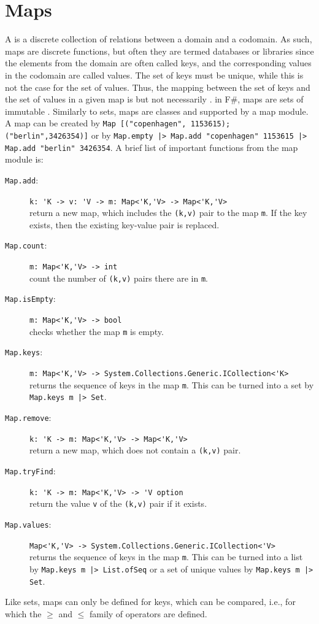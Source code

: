 \documentclass[fsharpNotes.tex]{subfiles}
\begin{document}
\section{Maps}
A  is a discrete collection of relations between a domain and a codomain. As such, maps are discrete functions, but often they are termed databases or libraries since the elements from the domain are often called keys, and the corresponding values in the codomain are called values. The set of keys must be unique, while this is not the case for the set of values. Thus, the mapping between the set of keys and the set of values in a given map is  but not necessarily . in F\#, maps are sets of immutable . Similarly to sets, maps are classes and supported by a map module. A map can be created by \lstinline{Map [("copenhagen", 1153615); ("berlin",3426354)]} or by \lstinline{Map.empty |> Map.add "copenhagen" 1153615 |> Map.add "berlin" 3426354}. A brief list of important functions from the map module is:
\begin{description}
\item[\texttt{Map.add}:] \lstinline{k: 'K -> v: 'V -> m: Map<'K,'V> -> Map<'K,'V>}~\\ return a new map, which includes the \lstinline{(k,v)} pair to the map \lstinline{m}. If the key exists, then the existing key-value pair is replaced.
\item[\texttt{Map.count}:] \lstinline{m: Map<'K,'V> -> int}~\\ count the number of \lstinline{(k,v)} pairs there are in \lstinline{m}.
\item[\texttt{Map.isEmpty}:] \lstinline{m: Map<'K,'V> -> bool}~\\ checks whether the map \lstinline{m} is empty.
\item[\texttt{Map.keys}:] \lstinline{m: Map<'K,'V> -> System.Collections.Generic.ICollection<'K>}~\\ returns the sequence of keys in the map \lstinline{m}. This can be turned into a set by \lstinline{Map.keys m |> Set}.
\item[\texttt{Map.remove}:] \lstinline{k: 'K -> m: Map<'K,'V> -> Map<'K,'V>}~\\ return a new map, which does not contain a \lstinline{(k,v)} pair.
\item[\texttt{Map.tryFind}:] \lstinline{k: 'K -> m: Map<'K,'V> -> 'V option}~\\ return the value \lstinline{v} of the \lstinline{(k,v)} pair if it exists.
\item[\texttt{Map.values}:] \lstinline{Map<'K,'V> -> System.Collections.Generic.ICollection<'V>}~\\returns the sequence of keys in the map \lstinline{m}. This can be turned into a list by \lstinline{Map.keys m |> List.ofSeq} or a set of unique values by \lstinline{Map.keys m |> Set}.
\end{description}
Like sets, maps can only be defined for keys, which can be compared, i.e., for which the $\ge$ and $\le$ family of operators are defined.
\end{document}
